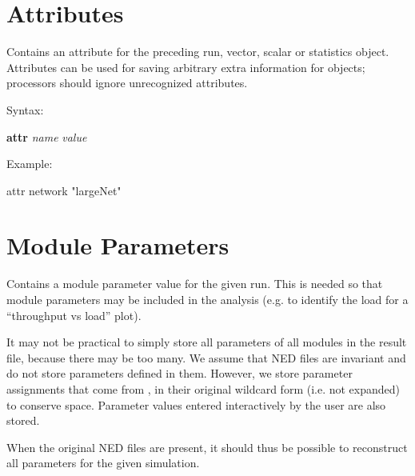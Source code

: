


\section{Attributes}
\label{sec:result-file-formats:attributes}

Contains an attribute for the preceding run, vector, scalar or
statistics object. Attributes can be used for saving arbitrary
extra information for objects; processors should ignore unrecognized
attributes.

Syntax:

\hspace{20mm} \textbf{attr} \textit{name} \textit{value}

Example:

\begin{filelisting}
attr network "largeNet"
\end{filelisting}



\section{Module Parameters}
\label{sec:result-file-formats:module-parameters}

Contains a module parameter value for the given run. This is needed so
that module parameters may be included in the analysis (e.g. to
identify the load for a ``throughput vs load'' plot).

It may not be practical to simply store all parameters of all modules in the
result file, because there may be too many. We assume that NED files are
invariant and do not store parameters defined in them. However, we store
parameter assignments that come from , in their original
wildcard form (i.e. not expanded) to conserve space. Parameter values
entered interactively by the user are also stored.

When the original NED files are present, it should thus be possible to
reconstruct all parameters for the given simulation.

